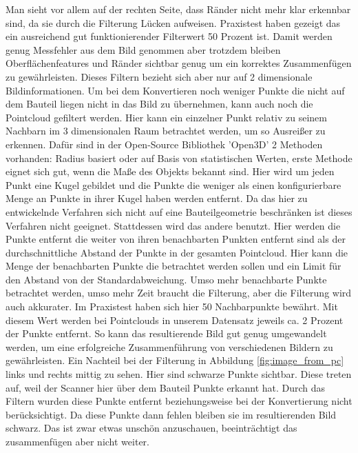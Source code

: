 \documentclass[../main.tex]{subfiles}
\begin{document}
Man sieht vor allem auf der rechten Seite, dass Ränder nicht mehr klar erkennbar sind, 
da sie durch die Filterung Lücken aufweisen. Praxistest haben gezeigt das ein 
ausreichend gut funktionierender Filterwert 50 Prozent ist. Damit werden genug 
Messfehler aus dem Bild genommen aber trotzdem bleiben Oberflächenfeatures und Ränder
sichtbar genug um ein korrektes Zusammenfügen zu gewährleisten.
Dieses Filtern bezieht sich aber nur auf 2 dimensionale Bildinformationen.
Um bei dem Konvertieren noch weniger Punkte die nicht auf dem Bauteil liegen nicht in das Bild zu übernehmen, kann auch noch die Pointcloud gefiltert werden.
Hier kann ein einzelner Punkt relativ zu seinem Nachbarn im 3 dimensionalen Raum betrachtet werden, 
um so Ausreißer zu erkennen. Dafür sind in der Open-Source
Bibliothek 'Open3D' 2 Methoden vorhanden: Radius basiert oder auf Basis von 
statistischen Werten, erste Methode eignet sich gut, wenn die Maße des Objekts bekannt
sind. Hier wird um jeden Punkt eine Kugel gebildet und die Punkte die weniger als 
einen konfigurierbare Menge an Punkte in ihrer Kugel haben werden entfernt. Da 
das hier zu entwickelnde Verfahren sich nicht auf eine Bauteilgeometrie beschränken
ist dieses Verfahren nicht geeignet. Stattdessen wird das andere benutzt. Hier werden
die Punkte entfernt die weiter von ihren benachbarten Punkten entfernt sind als der 
durchschnittliche Abstand der Punkte in der gesamten Pointcloud. Hier kann die Menge der 
benachbarten Punkte die betrachtet werden sollen und ein Limit für den Abstand von der 
Standardabweichung. Umso mehr benachbarte Punkte betrachtet werden, umso mehr Zeit 
braucht die Filterung, aber die Filterung wird auch akkurater. Im Praxistest haben sich
hier 50 Nachbarpunkte bewährt. Mit diesem Wert werden bei Pointclouds in unserem 
Datensatz jeweils ca. 2 Prozent der Punkte entfernt. So kann das resultierende
Bild gut genug umgewandelt werden, um eine erfolgreiche Zusammenführung 
von verschiedenen Bildern zu gewährleisten.
Ein Nachteil bei der Filterung in Abbildung \ref{fig:image_from_pc} links und rechts 
mittig zu sehen. Hier sind schwarze Punkte sichtbar. Diese treten auf, weil der Scanner
hier über dem Bauteil Punkte erkannt hat. Durch das Filtern wurden diese Punkte entfernt
beziehungsweise bei der Konvertierung nicht berücksichtigt. Da diese Punkte dann fehlen
bleiben sie im resultierenden Bild schwarz. Das ist zwar etwas unschön anzuschauen, 
beeinträchtigt das zusammenfügen aber nicht weiter. 
\end{document}
